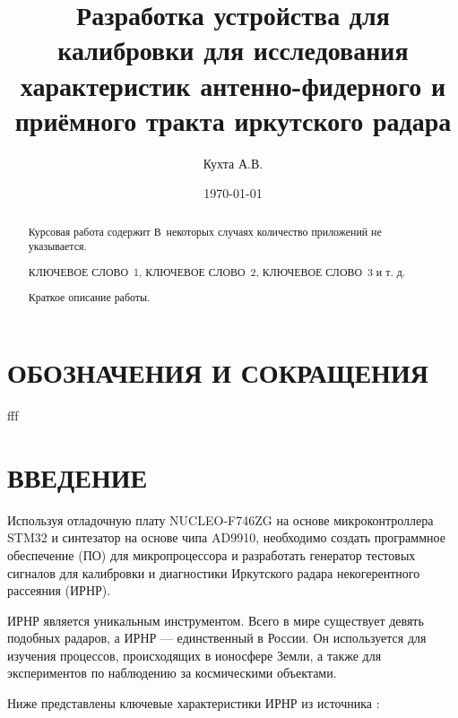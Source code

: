\documentclass[rusmathsym, eqnumwithinsec, amspack, hyperref]{bomgost}
\author{Кухта А.В.}
\title{Разработка устройства для калибровки для исследования характеристик антенно-фидерного и приёмного тракта иркутского радара}
\date{\today}
\begin{document}
\maketitle
\thispagestyle{empty}
\newpage

\begin{abstract}
Курсовая работа содержит \printtotpage \printtotfig \printtottab \printtotref[.] В~некоторых случаях количество приложений не указывается. 


КЛЮЧЕВОЕ СЛОВО~1, КЛЮЧЕВОЕ СЛОВО~2, КЛЮЧЕВОЕ СЛОВО~3 и т. д.

Краткое описание работы.
\end{abstract}


\tableofcontents


\section*{ОБОЗНАЧЕНИЯ И СОКРАЩЕНИЯ}
fff

%
%

\section*{ВВЕДЕНИЕ}
Используя отладочную плату NUCLEO-F746ZG на основе микроконтроллера STM32 и синтезатор на основе чипа AD9910, необходимо создать программное обеспечение (ПО) для микропроцессора и разработать генератор тестовых сигналов для калибровки и диагностики Иркутского радара некогерентного рассеяния (ИРНР).

ИРНР является уникальным инструментом. Всего в мире существует девять подобных радаров, а ИРНР --- единственный в России. Он используется для изучения процессов, происходящих в ионосфере Земли, а также для экспериментов по наблюдению за космическими объектами.

Ниже представлены ключевые характеристики ИРНР из источника \cite{Kushnarev}:
\end{document}

